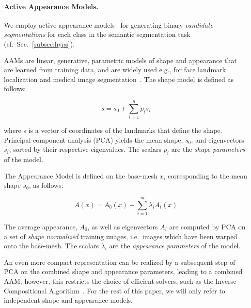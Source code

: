 \documentclass[10pt,twocolumn,letterpaper]{article}
\begin{document}
\paragraph{Active Appearance Models. }
We employ active appearance models~\cite{CootesAAM2001} for generating binary \emph{candidate segmentations} for each class in the semantic segmentation task (cf.\ Sec.\ \ref{subsec:hyps}). 

AAMs are linear, generative, parametric models of shape and appearance that are learned from training data, and are widely used e.g., for face landmark localization and medical image segmentation~\cite{Heimann2009543}. 
%
The shape model is defined as follows:

\[s = s_0 + \sum_{i=1}^n p_i s_i\]

where s is a vector of coordinates of the landmarks that define the shape.  Principal component analysis (PCA) yields the mean shape, $s_0$, and eigenvectors $s_i$, sorted by their respective eigenvalues. The scalars $p_i$ are the \emph{shape parameters} of the model. 

The Appearance Model is defined on the base-mesh  $x$, corresponding to the mean shape $s_0$, as follows:

\[A(x) = A_0(x) + \sum_{i=1}^m \lambda_i A_i(x)\]

The average appearance, $A_0$, as well as eigenvectors $A_i$ are computed by PCA on a set of \emph{shape normalized} training images, i.e.\ images which have been warped onto the base-mesh. The scalars $\lambda_i$ are the \emph{appearance parameters} of the model. 

An even more compact representation can be realized by a subsequent step of PCA on the combined shape and appearance parameters, leading to a combined AAM; however, this restricts the choice of efficient solvers, such as the Inverse Compositional Algorithm~\cite{BakerAAM2004}. 
For the rest of this paper, we will only refer to independent shape and appearance models.

%
\end{document}
